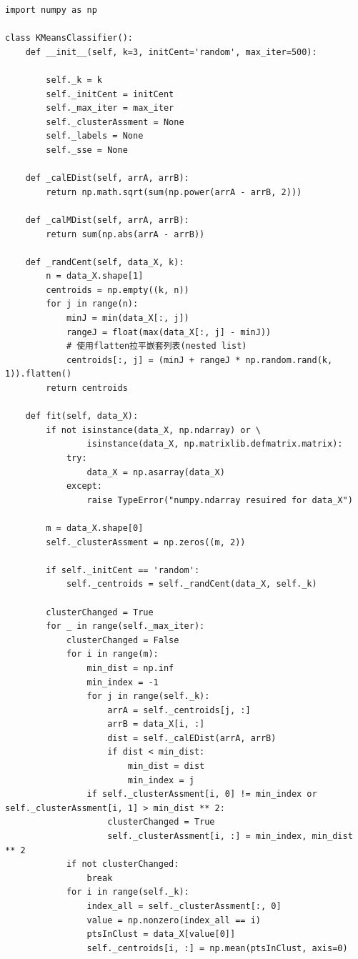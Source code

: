 \documentclass[11pt]{article}
\begin{document}
\begin{lstlisting}
import numpy as np

class KMeansClassifier():
    def __init__(self, k=3, initCent='random', max_iter=500):

        self._k = k
        self._initCent = initCent
        self._max_iter = max_iter
        self._clusterAssment = None
        self._labels = None
        self._sse = None

    def _calEDist(self, arrA, arrB):
        return np.math.sqrt(sum(np.power(arrA - arrB, 2)))

    def _calMDist(self, arrA, arrB):
        return sum(np.abs(arrA - arrB))

    def _randCent(self, data_X, k):
        n = data_X.shape[1]
        centroids = np.empty((k, n))
        for j in range(n):
            minJ = min(data_X[:, j])
            rangeJ = float(max(data_X[:, j] - minJ))
            # 使用flatten拉平嵌套列表(nested list)
            centroids[:, j] = (minJ + rangeJ * np.random.rand(k, 1)).flatten()
        return centroids

    def fit(self, data_X):
        if not isinstance(data_X, np.ndarray) or \
                isinstance(data_X, np.matrixlib.defmatrix.matrix):
            try:
                data_X = np.asarray(data_X)
            except:
                raise TypeError("numpy.ndarray resuired for data_X")

        m = data_X.shape[0]
        self._clusterAssment = np.zeros((m, 2))

        if self._initCent == 'random':
            self._centroids = self._randCent(data_X, self._k)

        clusterChanged = True
        for _ in range(self._max_iter):
            clusterChanged = False
            for i in range(m):
                min_dist = np.inf
                min_index = -1
                for j in range(self._k):
                    arrA = self._centroids[j, :]
                    arrB = data_X[i, :]
                    dist = self._calEDist(arrA, arrB)
                    if dist < min_dist:
                        min_dist = dist
                        min_index = j
                if self._clusterAssment[i, 0] != min_index or self._clusterAssment[i, 1] > min_dist ** 2:
                    clusterChanged = True
                    self._clusterAssment[i, :] = min_index, min_dist ** 2
            if not clusterChanged:
                break
            for i in range(self._k):
                index_all = self._clusterAssment[:, 0]
                value = np.nonzero(index_all == i)
                ptsInClust = data_X[value[0]]
                self._centroids[i, :] = np.mean(ptsInClust, axis=0)


\end{lstlisting}
\end{document}
